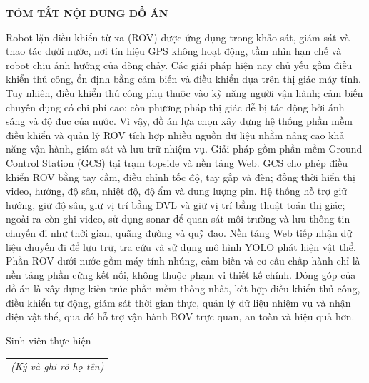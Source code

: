 \documentclass[../DoAn.tex]{subfiles}
\begin{document}
\begin{center}
    \Large{\textbf{TÓM TẮT NỘI DUNG ĐỒ ÁN}}\\
\end{center}
\vspace{1cm}
Robot lặn điều khiển từ xa (ROV) được ứng dụng trong khảo sát, giám sát và thao tác dưới nước, nơi tín hiệu GPS không hoạt động, tầm nhìn hạn chế và robot chịu ảnh hưởng của dòng chảy. Các giải pháp hiện nay chủ yếu gồm điều khiển thủ công, ổn định bằng cảm biến và điều khiển dựa trên thị giác máy tính. Tuy nhiên, điều khiển thủ công phụ thuộc vào kỹ năng người vận hành; cảm biến chuyên dụng có chi phí cao; còn phương pháp thị giác dễ bị tác động bởi ánh sáng và độ đục của nước. Vì vậy, đồ án lựa chọn xây dựng hệ thống phần mềm điều khiển và quản lý ROV tích hợp nhiều nguồn dữ liệu nhằm nâng cao khả năng vận hành, giám sát và lưu trữ nhiệm vụ. Giải pháp gồm phần mềm Ground Control Station (GCS) tại trạm topside và nền tảng Web. GCS cho phép điều khiển ROV bằng tay cầm, điều chỉnh tốc độ, tay gắp và đèn; đồng thời hiển thị video, hướng, độ sâu, nhiệt độ, độ ẩm và dung lượng pin. Hệ thống hỗ trợ giữ hướng, giữ độ sâu, giữ vị trí bằng DVL và giữ vị trí bằng thuật toán thị giác; ngoài ra còn ghi video, sử dụng sonar để quan sát môi trường và lưu thông tin chuyến đi như thời gian, quãng đường và quỹ đạo. Nền tảng Web tiếp nhận dữ liệu chuyến đi để lưu trữ, tra cứu và sử dụng mô hình YOLO phát hiện vật thể. Phần ROV dưới nước gồm máy tính nhúng, cảm biến và cơ cấu chấp hành chỉ là nền tảng phần cứng kết nối, không thuộc phạm vi thiết kế chính. Đóng góp của đồ án là xây dựng kiến trúc phần mềm thống nhất, kết hợp điều khiển thủ công, điều khiển tự động, giám sát thời gian thực, quản lý dữ liệu nhiệm vụ và nhận diện vật thể, qua đó hỗ trợ vận hành ROV trực quan, an toàn và hiệu quả hơn.


\begin{flushright}
Sinh viên thực hiện\\
\begin{tabular}{@{}c@{}}
\textit{(Ký và ghi rõ họ tên)}
\end{tabular}
\end{flushright}
\end{document}
